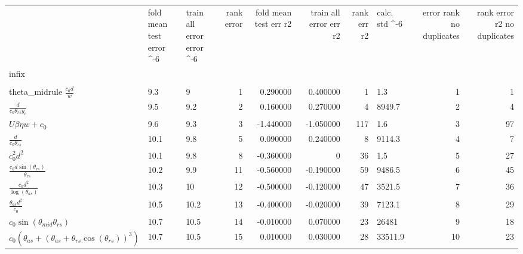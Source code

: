 \begin{tabularx}{\textwidth}{lllrrrrlrr}
\toprule
  &  fold mean test error \cdot 10^-6  &  train all error error \cdot 10^-6  &  rank error  &  fold mean test err r2  &  train all error err r2  &  rank err r2  &  calc. std \cdot 10^-6  &  error rank no duplicates  &  rank error r2 no duplicates  \\ 
infix  &    &    &    &    &    &    &    &    &    \\ 
\\theta_{mid}rule
$ \displaystyle\frac{c_{0} d}{w} $  &  9.3  &  9\phantom{.0}  &  1  &  0.290000  &  0.400000  &  1  &  1.3  &  1\phantom{.000000}  &  1\phantom{.000000}  \\ 
$ \displaystyle\frac{d}{c_{0} \theta_{rs} y_c} $  &  9.5  &  9.2  &  2  &  0.160000  &  0.270000  &  4  &  8949.7  &  2\phantom{.000000}  &  4\phantom{.000000}  \\ 
$ U \beta \eta w + c_{0} $  &  9.6  &  9.3  &  3  &  -1.440000  &  -1.050000  &  117  &  1.6  &  3\phantom{.000000}  &  97\phantom{.000000}  \\ 
$ \displaystyle\frac{d}{c_{0} \theta_{rs}} $  &  10.1  &  9.8  &  5  &  0.090000  &  0.240000  &  8  &  9114.3  &  4\phantom{.000000}  &  7\phantom{.000000}  \\ 
$ c_{0}^{2} d^{2} $  &  10.1  &  9.8  &  8  &  -0.360000  &  0\phantom{.000000}  &  36  &  1.5  &  5\phantom{.000000}  &  27\phantom{.000000}  \\ 
$ \displaystyle\frac{c_{0} d \sin{\left(\theta_{rs} \right)}}{\theta_{rs}} $  &  10.2  &  9.9  &  11  &  -0.560000  &  -0.190000  &  59  &  9486.5  &  6\phantom{.000000}  &  45\phantom{.000000}  \\ 
$ \displaystyle\frac{c_{0} d^{2}}{\log{\left(\theta_{as} \right)}} $  &  10.3  &  10\phantom{.0}  &  12  &  -0.500000  &  -0.120000  &  47  &  3521.5  &  7\phantom{.000000}  &  36\phantom{.000000}  \\ 
$ \displaystyle\frac{\theta_{as} d^{2}}{c_{0}} $  &  10.5  &  10.2  &  13  &  -0.400000  &  -0.020000  &  39  &  7123.1  &  8\phantom{.000000}  &  29\phantom{.000000}  \\ 
$ c_{0} \sin{\left(\theta_{mid} \theta_{rs} \right)} $  &  10.7  &  10.5  &  14  &  -0.010000  &  0.070000  &  23  &  26481\phantom{.0}  &  9\phantom{.000000}  &  18\phantom{.000000}  \\ 
$ c_{0} \left(\theta_{as} + \left(\theta_{as} + \theta_{rs} \cos{\left(\theta_{rs} \right)}\right)^{3}\right) $  &  10.7  &  10.5  &  15  &  0.010000  &  0.030000  &  28  &  33511.9  &  10\phantom{.000000}  &  23\phantom{.000000}  \\ 

\end{tabularx}
